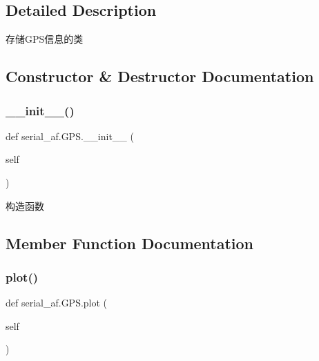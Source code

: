\subsection{Detailed Description}
存储\+G\+P\+S信息的类 



\subsection{Constructor \& Destructor Documentation}
\mbox{\label{classserial__af_1_1_g_p_s_af29743401202ab768a17e832a50da925}} 
\subsubsection{\texorpdfstring{\+\_\+\+\_\+init\+\_\+\+\_\+()}{\_\_init\_\_()}}
{\footnotesize\ttfamily def serial\+\_\+af.\+G\+P\+S.\+\_\+\+\_\+init\+\_\+\+\_\+ (\begin{DoxyParamCaption}\item[{}]{self }\end{DoxyParamCaption})}



构造函数 



\subsection{Member Function Documentation}
\mbox{\label{classserial__af_1_1_g_p_s_aa4d60bc2c75da65096c5bbeece8c9a27}} 
\subsubsection{\texorpdfstring{plot()}{plot()}}
{\footnotesize\ttfamily def serial\+\_\+af.\+G\+P\+S.\+plot (\begin{DoxyParamCaption}\item[{}]{self }\end{DoxyParamCaption})}



